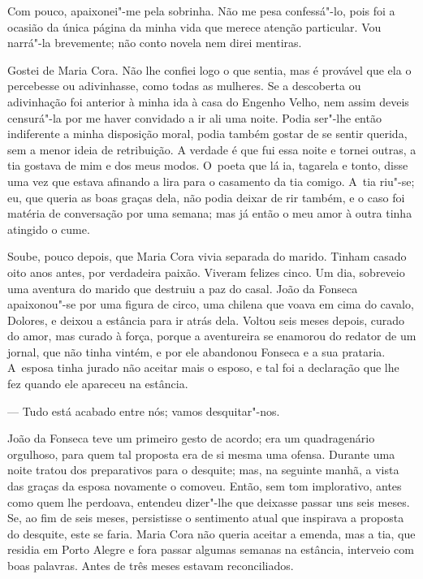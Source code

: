 \begin{linenumbers}
Com pouco, apaixonei"-me pela sobrinha. Não me pesa confessá"-lo, pois foi
a ocasião da única página da minha vida que merece atenção particular.
Vou narrá"-la brevemente; não conto novela nem direi mentiras.

Gostei de Maria Cora. Não lhe confiei logo o que sentia, mas é provável
que ela o percebesse ou adivinhasse, como todas as mulheres. Se a
descoberta ou adivinhação foi anterior à minha ida à casa do Engenho
Velho, nem assim deveis censurá"-la por me haver convidado a ir ali uma
noite. Podia ser"-lhe então indiferente a minha disposição moral, podia
também gostar de se sentir querida, sem a menor ideia de retribuição. A
verdade é que fui essa noite e tornei outras, a tia gostava de mim e dos
meus modos. O~poeta que lá ia, tagarela e tonto, disse uma vez que
estava afinando a lira para o casamento da tia comigo. A~tia riu"-se; eu,
que queria as boas graças dela, não podia deixar de rir também, e o caso
foi matéria de conversação por uma semana; mas já então o meu amor à
outra tinha atingido o cume.

Soube, pouco depois, que Maria Cora vivia separada do marido. Tinham
casado oito anos antes, por verdadeira paixão. Viveram felizes cinco. Um
dia, sobreveio uma aventura do marido que destruiu a paz do casal. João
da Fonseca apaixonou"-se por uma figura de circo, uma chilena que voava
em cima do cavalo, Dolores, e deixou a estância para ir atrás dela.
Voltou seis meses depois, curado do amor, mas curado à força, porque a
aventureira se enamorou do redator de um jornal, que não tinha vintém, e
por ele abandonou Fonseca e a sua prataria. A~esposa tinha jurado não
aceitar mais o esposo, e tal foi a declaração que lhe fez quando ele
apareceu na estância.

--- Tudo está acabado entre nós; vamos desquitar"-nos.

João da Fonseca teve um primeiro gesto de acordo; era um quadragenário
orgulhoso, para quem tal proposta era de si mesma uma ofensa. Durante
uma noite tratou dos preparativos para o desquite; mas, na seguinte
manhã, a vista das graças da esposa novamente o comoveu. Então, sem tom
implorativo, antes como quem lhe perdoava, entendeu dizer"-lhe que
deixasse passar uns seis meses. Se, ao fim de seis meses, persistisse o
sentimento atual que inspirava a proposta do desquite, este se faria.
Maria Cora não queria aceitar a emenda, mas a tia, que residia em Porto
Alegre e fora passar algumas semanas na estância, interveio com boas
palavras. Antes de três meses estavam reconciliados.


\end{linenumbers}
